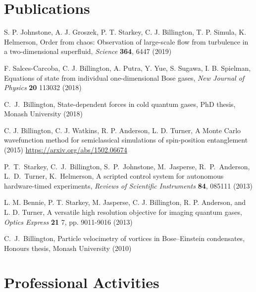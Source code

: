 \documentclass[10pt,a4paper]{article}
\renewenvironment{itemize}{
  \begin{list}{}{
    \setlength{\leftmargin}{1.5em}
    \setlength{\itemsep}{0.25em}
    \setlength{\parskip}{0pt}
    \setlength{\parsep}{0.25em}
  }
}{
  \end{list}
}
\begin{document}
\section*{Publications}

\begin{itemize}

\item S. P. Johnstone, A. J. Groszek, P. T. Starkey, C. J. Billington, T. P. Simula, K. Helmerson, Order from chaos: Observation of large-scale flow from turbulence in a two-dimensional superfluid, \textit{Science} {\bf 364}, 6447 (2019) 

\item F. Salces-Carcoba, C. J. Billington, A. Putra, Y. Yue, S. Sugawa, I. B. Spielman, Equations of state from individual one-dimensional Bose gases, \textit{New Journal of Physics} {\bf 20} 113032 (2018) 

\item C.~J.~Billington, State-dependent forces in cold quantum gases, PhD thesis, Monash University (2018) 

\item C. J. Billington, C. J. Watkins, R. P. Anderson, L. D. Turner, A Monte Carlo wavefunction method for semiclassical simulations of spin-position entanglement (2015) \url{https://arxiv.org/abs/1502.06674}

\item P.~T.~Starkey, C.~J.~Billington, S.~P.~Johnstone, M.~Jasperse, R.~P.~Anderson, L.~D.~Turner, K.~Helmerson, A scripted control system for autonomous hardware-timed experiments, \textit{Reviews of Scientific Instruments} {\bf 84}, 085111 (2013) 

\item L. M. Bennie, P. T. Starkey, M. Jasperse, C. J. Billington, R. P. Anderson, and L. D. Turner, A versatile high resolution objective for imaging quantum gases, \textit{Optics Express} {\bf 21} 7, pp. 9011-9016 (2013) 

\item C.~J.~Billington, Particle velocimetry of vortices in Bose--Einstein condensates, Honours thesis, Monash University (2010) 

    
\end{itemize}

\section*{Professional Activities}
\end{document}
